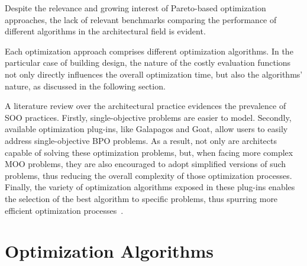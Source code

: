 	Despite the relevance and growing interest of Pareto-based optimization approaches, the lack of relevant benchmarks comparing the performance of different algorithms in the architectural field is evident. 

	Each optimization approach comprises different optimization algorithms. In the particular case of building design, the nature of the costly evaluation functions not only directly influences the overall optimization time, but also the algorithms' nature, as discussed in the following section. 
	
	A literature review over the architectural practice evidences the prevalence of \ac{SOO} practices. Firstly, single-objective problems are easier to model. Secondly, available optimization plug-ins, like Galapagos and Goat, allow users to easily address single-objective \ac{BPO} problems. As a result, not only are architects capable of solving these optimization problems, but, when facing more complex \ac{MOO} problems, they are also encouraged to adopt simplified versions of such problems, thus reducing the overall complexity of those optimization processes. Finally, the variety of optimization algorithms exposed in these plug-ins enables the selection of the best algorithm to specific problems, thus spurring more efficient optimization processes~\cite{Wortmann2016BBO}.  
	

\section{Optimization Algorithms}
\label{sec:optimizationalgorithms}
	
